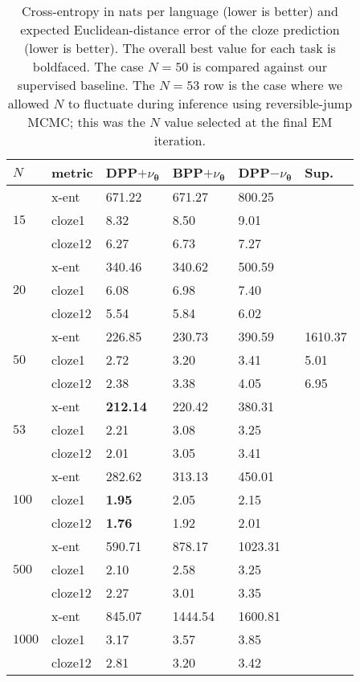 \documentclass[11pt,a4paper]{article}
\newcommand{\xmark}{\ding{55}}%
\newcommand{\vtheta}{{\boldsymbol \theta}}
\newcommand{\NN}{\nu_{\vtheta}}
\begin{document}
\begin{table}
  \centering
  \begin{adjustbox}{width=1.\columnwidth}
  \begin{tabular}{ll llll} \toprule
    $N$ & metric & DPP$+\NN$  & BPP$+\NN$ & DPP$-\NN$  & Sup.  \\ \midrule
        & x-ent & 671.22 & 671.27 &800.25 & \xmark  \\
    $15$  & cloze1 & 8.32 & 8.50 & 9.01 & \xmark \\
	& cloze12 & 6.27 & 6.73 & 7.27 & \xmark \\ \midrule
    & x-ent & 340.46 & 340.62 & 500.59 & \xmark  \\
    $20$  & cloze1 &  6.08 & 6.98 & 7.40 & \xmark \\
	& cloze12 &  5.54 & 5.84 & 6.02 & \xmark \\ \midrule
    & x-ent & 226.85 & 230.73 & 390.59 &  1610.37\\
      $50$ & cloze1 & 2.72 & 3.20 & 3.41 & 5.01  \\
	& cloze12 & 2.38 & 3.38 & 4.05 &  6.95 \\ \midrule
    & x-ent & \textbf{212.14} & 220.42  & 380.31 & \xmark\\
          $53$ & cloze1 & 2.21 & 3.08 & 3.25 & \xmark  \\
	& cloze12 & 2.01 & 3.05 & 3.41 &  \xmark  \\ \midrule
    & x-ent & 282.62 & 313.13  & 450.01 & \xmark\\
     $100$  &  cloze1 & \textbf{1.95} & 2.05 & 2.15 & \xmark\\
 	& cloze12 & \textbf{1.76} & 1.92 & 2.01 & \xmark \\ \midrule
   &  x-ent & 590.71& 878.17  & 1023.31 & \xmark\\
     $500$  & cloze1 & 2.10 & 2.58 & 3.25 & \xmark \\
	& cloze12 & 2.27 & 3.01 & 3.35 & \xmark \\ \midrule
    & x-ent & 845.07 & 1444.54  & 1600.81 & \xmark \\
    $1000$ & cloze1 & 3.17 & 3.57 & 3.85 & \xmark \\
	& cloze12 &  2.81 & 3.20 & 3.42 & \xmark \\
    \bottomrule
  \end{tabular}
  \end{adjustbox}
  \caption{Cross-entropy in nats per language (lower is better) and expected
    Euclidean-distance error of
    the cloze prediction (lower is better).  The overall best value for each task
    is boldfaced.  The case $N=50$ is compared against our supervised baseline.
    The $N = 53$ row is the case where we allowed $N$ to fluctuate during inference using reversible-jump
    MCMC; this was the $N$ value selected at the final EM iteration.}
  \label{tab:results}
\end{table}
\end{document}
